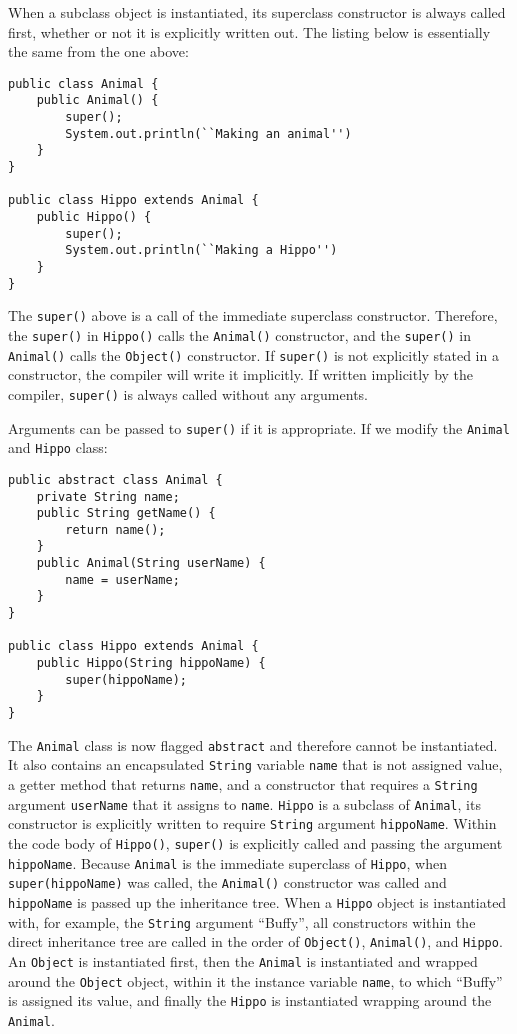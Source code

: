 \documentclass{tufte-handout}
\begin{document}
    When a subclass object is instantiated, its superclass constructor is always called first, whether or not it is explicitly written out. The listing below is essentially the same from the one above:

    \begin{lstlisting}
public class Animal {
    public Animal() {
        super();
        System.out.println(``Making an animal'')
    }
}

public class Hippo extends Animal {
    public Hippo() {
        super();
        System.out.println(``Making a Hippo'')
    }
} 
    \end{lstlisting}

    The \texttt{super()} above is a call of the immediate superclass constructor. Therefore, the \texttt{super()} in \texttt{Hippo()} calls the \texttt{Animal()} constructor, and the \texttt{super()} in \texttt{Animal()} calls the \texttt{Object()} constructor. If \texttt{super()} is not explicitly stated in a constructor, the compiler will write it implicitly. If written implicitly by the compiler, \texttt{super()} is always called without any arguments.

    Arguments can be passed to \texttt{super()} if it is appropriate. If we modify the \texttt{Animal} and \texttt{Hippo} class:

    \begin{lstlisting}
public abstract class Animal {
    private String name;
    public String getName() {
        return name();
    }
    public Animal(String userName) {
        name = userName;
    }
}

public class Hippo extends Animal {
    public Hippo(String hippoName) {
        super(hippoName);
    }
} 
    \end{lstlisting}
    The \texttt{Animal} class is now flagged \texttt{abstract} and therefore cannot be instantiated. It also contains an encapsulated \texttt{String} variable \texttt{name} that is not assigned value, a getter method that returns \texttt{name}, and a constructor that requires a \texttt{String} argument \texttt{userName} that it assigns to \texttt{name}. \texttt{Hippo} is a subclass of \texttt{Animal}, its constructor is explicitly written to require \texttt{String} argument \texttt{hippoName}. Within the code body of \texttt{Hippo()}, \texttt{super()} is explicitly called and passing the argument \texttt{hippoName}. Because \texttt{Animal} is the immediate superclass of \texttt{Hippo}, when \texttt{super(hippoName)} was called, the \texttt{Animal()} constructor was called and \texttt{hippoName} is passed up the inheritance tree. When a \texttt{Hippo} object is instantiated with, for example, the \texttt{String} argument ``Buffy'', all constructors within the direct inheritance tree are called in the order of \texttt{Object()}, \texttt{Animal()}, and \texttt{Hippo}. An \texttt{Object} is instantiated first, then the \texttt{Animal} is instantiated and wrapped around the \texttt{Object} object, within it the instance variable \texttt{name}, to which ``Buffy'' is assigned its value, and finally the \texttt{Hippo} is instantiated wrapping around the \texttt{Animal}. 
\end{document}
